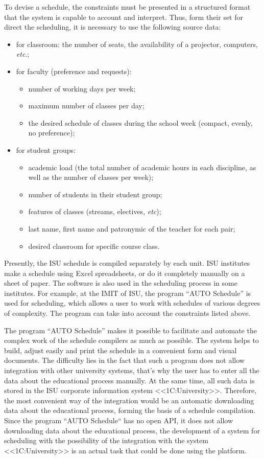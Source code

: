 \documentclass[
]{ceurart}
\begin{document}
To devise a schedule, the constraints must be presented in a structured format that the system is capable to account and interpret.  Thus, form their set for direct the scheduling, it is necessary to use the following source data:
\begin{itemize}
    \item for classroom: the number of seats, the availability of a projector, computers, \emph{etc}.;
    \item for faculty (preference and requests):
    \begin{itemize}
        \item number of working days per week;
        \item maximum number of classes per day;
        \item the desired schedule of classes during the school week (compact, evenly, no preference);
    \end{itemize}
    \item for student groups:
    \begin{itemize}
        \item academic load (the total number of academic hours in each discipline, as well as the number of classes per week);
        \item number of students in their student group;
        \item features of classes (streams, electives, \emph{etc});
        \item last name, first name and patronymic of the teacher for each pair;
        \item desired classroom for specific course class.
    \end{itemize}
\end{itemize}

Presently, the ISU schedule is compiled separately by each unit.  ISU institutes make a schedule using Excel spreadsheets, or do it completely manually on a sheet of paper. The software is also used in the scheduling process in some institutes. For example, at the IMIT of ISU, the program ``AUTO Schedule'' is used for scheduling, which allows a user to work with schedules of various degrees of complexity. The program can take into account the constraints listed above.

The program ``AUTO Schedule'' makes it possible to facilitate and automate the complex work of the schedule compilers as much as possible. The system helps to build, adjust easily and print the schedule in a convenient form  and visual documents. The difficulty lies in the fact that such a program does not allow integration with other university systems, that's why the user has to enter all the data about the educational process manually.  At the same time, all such data is stored in the ISU corporate information system <<1C:University>>. Therefore, the most convenient way of the integration would be an automatic downloading data about the educational process, forming the basis of a schedule compilation. Since the program ``AUTO Schedule`` has no open API, it does not allow downloading data about the educational process, the development of a system for scheduling with the possibility of the integration with the system <<1C:University>> is an actual task that could be done using the platform.
\end{document}
